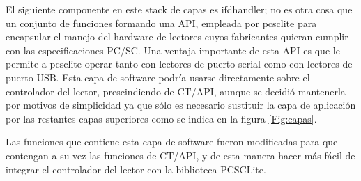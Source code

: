 \documentclass[%
        final,
        notitlepage,
        narroweqnarray,
        inline,
        ]{ieee}
\begin{document}
%

%
%
%


El siguiente componente en este stack de capas es ifdhandler; no es otra cosa que un conjunto de funciones formando una API, empleada por pcsclite para encapsular el manejo del hardware de lectores cuyos fabricantes quieran cumplir con las especificaciones PC/SC. Una ventaja importante de esta API es que le permite a pcsclite operar tanto con lectores de puerto serial como con lectores de puerto USB.
Esta capa de software podría usarse directamente sobre el controlador del lector, prescindiendo de CT/API, aunque se decidió mantenerla por motivos de simplicidad ya que sólo es necesario sustituir la capa de aplicación por las restantes capas superiores como se indica en la figura \ref{Fig:capas}.


Las funciones que contiene esta capa de software fueron modificadas para que contengan a su vez las funciones de CT/API, y de esta manera hacer más fácil de integrar el controlador del lector con la biblioteca PCSCLite.


%

%
%
%
%
%
\end{document}
